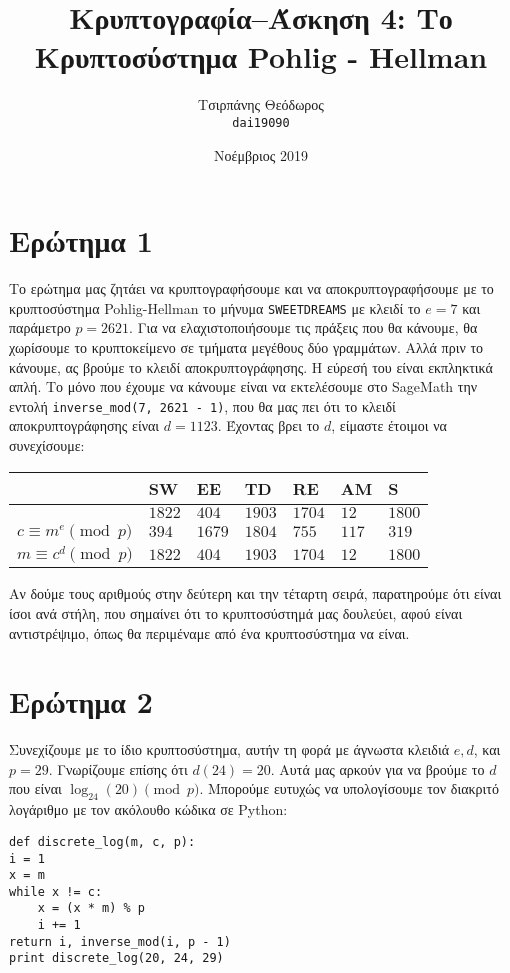 \documentclass{article}
\title{Κρυπτογραφία--Άσκηση 4: Το Κρυπτοσύστημα Pohlig - Hellman}
\author{Τσιρπάνης Θεόδωρος\\ \texttt{dai19090}}
\date{Νοέμβριος 2019}
\begin{document}
\maketitle

\section*{Ερώτημα 1}

Το ερώτημα μας ζητάει να κρυπτογραφήσουμε και να αποκρυπτογραφήσουμε με το κρυπτοσύστημα Pohlig-Hellman το μήνυμα \texttt{SWEETDREAMS} με κλειδί το $e = 7$ και παράμετρο $p = 2621$. Για να ελαχιστοποιήσουμε τις πράξεις που θα κάνουμε, θα χωρίσουμε το κρυπτοκείμενο σε τμήματα μεγέθους δύο γραμμάτων. Αλλά πριν το κάνουμε, ας βρούμε το κλειδί αποκρυπτογράφησης. Η εύρεσή του είναι εκπληκτικά απλή. Το μόνο που έχουμε να κάνουμε είναι να εκτελέσουμε στο SageMath την εντολή \lstinline|inverse_mod(7, 2621 - 1)|, που θα μας πει ότι το κλειδί αποκρυπτογράφησης είναι $d = 1123$. Έχοντας βρει το $d$, είμαστε έτοιμοι να συνεχίσουμε:

\begin{longtable}[c]{|l|l|l|l|l|l|l|}
\hline
& SW & EE & TD & RE & AM & S \\
\hline
& $1822$ & $404$ & $1903$ & $1704$ & $12$ & $1800$ \\
\hline
$c \equiv m^e \pmod p$ & $394$ & $1679$ & $1804$ & $755$ & $117$ & $319$ \\
\hline
$m \equiv c^d \pmod p$ & $1822$ & $404$ & $1903$ & $1704$ & $12$ & $1800$ \\
\hline
\end{longtable}

Αν δούμε τους αριθμούς στην δεύτερη και την τέταρτη σειρά, παρατηρούμε ότι είναι ίσοι ανά στήλη, που σημαίνει ότι το κρυπτοσύστημά μας δουλεύει, αφού είναι αντιστρέψιμο, όπως θα περιμέναμε από ένα κρυπτοσύστημα να είναι.

\section*{Ερώτημα 2}

Συνεχίζουμε με το ίδιο κρυπτοσύστημα, αυτήν τη φορά με άγνωστα κλειδιά $e, d$, και $p = 29$. Γνωρίζουμε επίσης ότι $d(24) = 20$. Αυτά μας αρκούν για να βρούμε το $d$ που είναι $\log_{24}(20) \pmod p$. Μπορούμε ευτυχώς να υπολογίσουμε τον διακριτό λογάριθμο με τον ακόλουθο κώδικα σε Python:

\begin{lstlisting}
def discrete_log(m, c, p):
i = 1
x = m
while x != c:
    x = (x * m) % p
    i += 1
return i, inverse_mod(i, p - 1)
print discrete_log(20, 24, 29)
\end{lstlisting}
\end{document}
